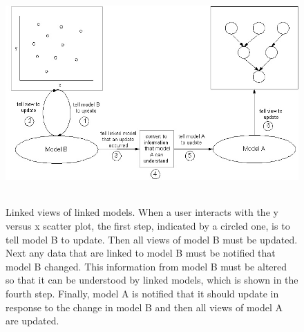\documentclass[11pt]{article}
\newcommand{\Robject}[1]{{\texttt{#1}}}
\begin{document}
\begin{figure}[ht]
  \begin{center}
    \includegraphics[height=3.3in, width=6in]{firstMessagePassing.jpg}
    \caption{ Linked views of linked models.  When a user interacts with
      the y versus x scatter plot, the first step, indicated by a circled one,
      is to tell model B to update.  Then all views of model B must be
      updated.  Next any data that are linked to model B must be notified
      that model B changed.  This information from model B must be
      altered so that it can be understood by linked models, which is shown
      in the fourth step.  Finally, model A is notified that it should
      update in response to the change in model B and then all views of
      model A are updated. }
    \label{Fig:firstMP}
  \end{center}
\end{figure}


\end{document}
